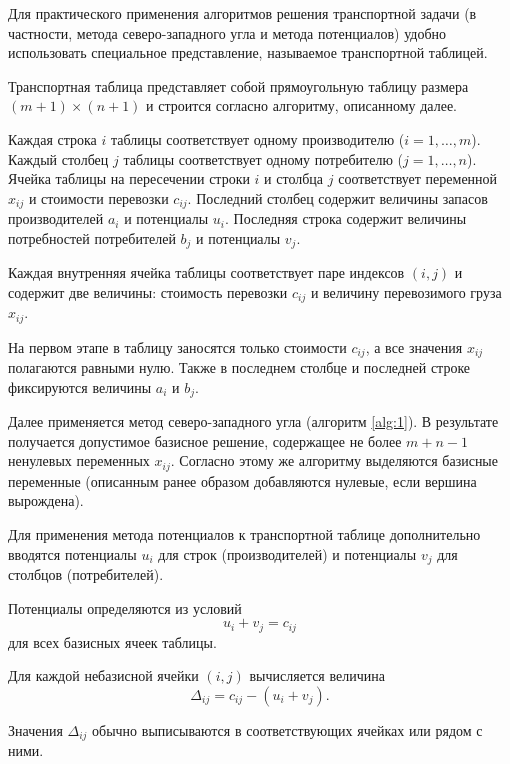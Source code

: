 \documentclass[12pt]{article}
\theoremstyle{definition}
\theoremstyle{plain}
\theoremstyle{definition}
\begin{document}
Для практического применения алгоритмов решения транспортной задачи
(в частности, метода северо-западного угла и метода потенциалов)
удобно использовать специальное представление,
называемое транспортной таблицей\cite{conf3}.

Транспортная таблица представляет собой прямоугольную таблицу
размера $(m+1) \times (n+1)$ и строится согласно алгоритму, описанному далее.

Каждая строка $i$ таблицы соответствует одному производителю ($i = 1,\dots,m$).
Каждый столбец $j$ таблицы соответствует одному потребителю ($j = 1,\dots,n$).
Ячейка таблицы на пересечении строки $i$ и столбца $j$
соответствует переменной $x_{ij}$ и стоимости перевозки $c_{ij}$.
Последний столбец содержит величины запасов производителей $a_i$ и потенциалы $u_i$.
Последняя строка содержит величины потребностей потребителей $b_j$ и потенциалы $v_j$.

Каждая внутренняя ячейка таблицы соответствует паре индексов $(i,j)$
и содержит две величины: стоимость перевозки $c_{ij}$ и величину перевозимого груза $x_{ij}$.


На первом этапе в таблицу заносятся только стоимости $c_{ij}$,
а все значения $x_{ij}$ полагаются равными нулю.
Также в последнем столбце и последней строке фиксируются величины
$a_i$ и $b_j$.

Далее применяется метод северо-западного угла (алгоритм \ref{alg:1}).
В результате получается допустимое базисное решение,
содержащее не более $m+n-1$ ненулевых переменных $x_{ij}$.
Согласно этому же алгоритму выделяются базисные переменные (описанным ранее
образом добавляются нулевые, если вершина вырождена).

Для применения метода потенциалов к транспортной таблице
дополнительно вводятся потенциалы $u_i$ для строк (производителей)
и потенциалы $v_j$ для столбцов (потребителей).

Потенциалы определяются из условий
\[
u_i + v_j = c_{ij}
\]
для всех базисных ячеек таблицы.

Для каждой небазисной ячейки $(i,j)$ вычисляется величина
\[
\Delta_{ij} = c_{ij} - (u_i + v_j).
\]

Значения $\Delta_{ij}$ обычно выписываются в соответствующих ячейках
или рядом с ними.
\end{document}
